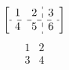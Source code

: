 \documentclass{article}
\begin{document}
\[ \left[\begin{array}{cc:c} 1 & 2 & 3\\ \hdashline 4 & 5 & 6 \end{array}\right] \]
\[ \begin{array}{cc} 1 & 2\\ \hline 3 & 4 \end{array} \]
\end{document}
